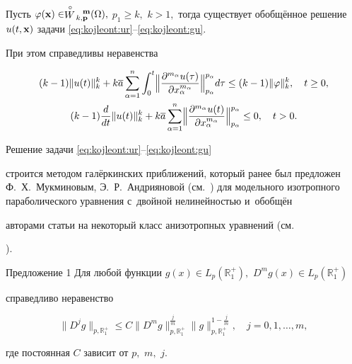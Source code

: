 \begin{theorem}[3]Пусть $\varphi({\bf x})\in \stackrel{\circ}{W}\!{}_{k,{\bf p}}^{\;\;\;\bf{m}}(\Omega),$ $p_1\geq k,$ $k>1,$ тогда существует обобщённое решение $u(t,{\bf x})$ задачи \eqref{eq:kojleont:ur}--\eqref{eq:kojleont:gu}$.$ 

При этом справедливы неравенства

\begin{gather}

\label{eq:kojleont:theorem_4_3}

(k-1)\|u(t)\|^k_k+k\overline{a}\sum_{\alpha=1}^n\int_0^t \Bigl\|\frac{\partial^{m_\alpha}u(\tau)}{\partial

x_\alpha^{m_\alpha}}\Bigr\|_{p_{\alpha}}^{p_{\alpha}}d\tau\leq

(k-1)\|\varphi\|^k_k,\quad t\geq 0,\\

\label{eq:kojleont:theorem_4_4}

(k-1)\frac{d}{dt}\|u(t)\|^k_k+k\overline{a}\sum_{\alpha=1}^n

\Bigl\|\frac{\partial^{m_\alpha}u(t)}{\partial x_\alpha^{m_\alpha}}\Bigr\|_{p_{\alpha}}^{p_{\alpha}}\leq 0,\quad

t>0.

\end{gather}

\end{theorem}



\smallskip



Решение задачи \eqref{eq:kojleont:ur}--\eqref{eq:kojleont:gu}

строится методом галёркинских приближений, который ранее был предложен Ф.~Х.~Мукминовым, Э.~Р.~Андрияновой (см.~\cite{kojleont:bib:and_muk}) для модельного изотропного параболического уравнения с~двойной нелинейностью и~обобщён

авторами статьи на некоторый класс анизотропных уравнений (см.~\cite{kojleont:bib:umg_2011,kojleont:bib:umg_2012}

).



\smallskip



\begin{newthm}{Предложение 1} Для любой функции $g(x)\in L_p(\mathbb{R}_{1}^+),$ $D^mg(x)\in L_p(\mathbb{R}_{1}^+)$

справедливо неравенство

\begin{equation}

\label{eq:kojleont:N-G} \|D^jg\|_{p,\mathbb{R}_{1}^+}\leq C

\|D^mg\|_{p,\mathbb{R}_{1}^+}^{\frac{j}{m}}

\|g\|_{p,\mathbb{R}_{1}^+}^{1-\frac{j}{m}},\quad j=0, 1, \dots, m,

\end{equation}

где постоянная $C$ зависит от $p,$ $m,$ $j.$

\end{newthm}



